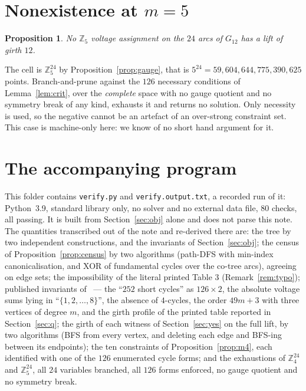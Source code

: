 \documentclass[11pt]{amsart}
\newtheorem{proposition}[theorem]{Proposition}
\theoremstyle{remark}
\newcommand{\Gt}{G_{12}}
\begin{document}
\section{Nonexistence at $m = 5$}\label{sec:m5}

\begin{proposition}\label{prop:m5}
No $\mathbb{Z}_5$ voltage assignment on the $24$ arcs of $\Gt$ has a lift of
girth $12$.
\end{proposition}

The cell is $\mathbb{Z}_5^{24}$ by Proposition~\ref{prop:gauge}, that is
$5^{24} = 59{,}604{,}644{,}775{,}390{,}625$ points. Branch-and-prune against the
$126$ necessary conditions of Lemma~\ref{lem:crit}, over the \emph{complete}
space with no gauge quotient and no symmetry break of any kind, exhausts it and
returns no solution. Only necessity is used, so the negative cannot be an
artefact of an over-strong constraint set. This case is machine-only here: we
know of no short hand argument for it.

\section{The accompanying program}\label{sec:prog}

This folder contains \texttt{verify.py} and \texttt{verify.output.txt}, a
recorded run of it: Python~3.9, standard library only, no solver and no external
data file, $80$ checks, all passing. It is built from Section~\ref{sec:obj}
alone and does not parse this note. The quantities transcribed out of the note
and re-derived there are: the tree by two independent constructions, and the
invariants of Section~\ref{sec:obj};
the census of Proposition~\ref{prop:census} by two algorithms (path-DFS with
min-index canonicalisation, and XOR of fundamental cycles over the co-tree
arcs), agreeing on edge sets; the impossibility of the literal printed Table 3
(Remark~\ref{rem:typo}); published invariants of~\cite{AAB} --- the
``$252$ short cycles'' as $126 \times 2$, the absolute voltage sums lying in
``$\{1,2,\dots,8\}$'', the absence of $4$-cycles, the order $49m+3$ with three
vertices of degree $m$, and the girth profile of the printed table reported in
Section~\ref{sec:q}; the girth of each
witness of Section~\ref{sec:yes} on the full lift, by two algorithms
(BFS from every vertex, and deleting each edge and BFS-ing between its
endpoints); the ten constraints of Proposition~\ref{prop:m4}, each identified
with one of the $126$ enumerated cycle forms; and the exhaustions of
$\mathbb{Z}_4^{24}$ and
$\mathbb{Z}_5^{24}$, all $24$ variables branched, all $126$ forms enforced, no
gauge quotient and no symmetry break.
\end{document}
